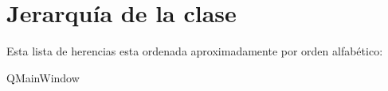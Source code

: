 \section{Jerarquía de la clase}
Esta lista de herencias esta ordenada aproximadamente por orden alfabético\+:\begin{DoxyCompactList}
\item {}
\item {}
\item {}
\item Q\+Main\+Window\begin{DoxyCompactList}
\item {}
\end{DoxyCompactList}
\end{DoxyCompactList}
